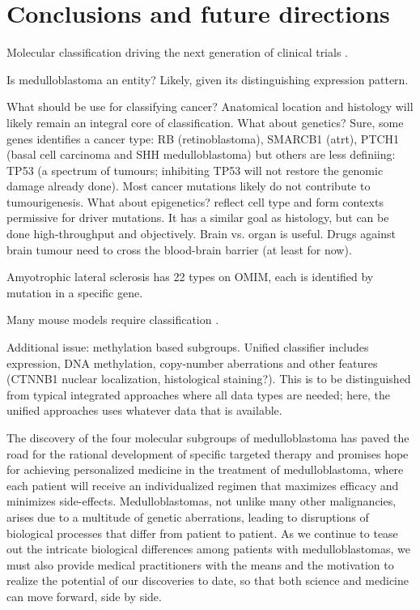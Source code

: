 \chapter{Conclusions and future directions}
\label{ch:conclusion}

Molecular classification driving the next generation of clinical trials .

Is medulloblastoma an entity?
Likely, given its distinguishing expression pattern.

What should be use for classifying cancer?
Anatomical location and histology will likely remain an integral core of classification.
What about genetics? Sure, some genes identifies a cancer type: RB (retinoblastoma), SMARCB1 (\gls{atrt}), PTCH1 (basal cell carcinoma and SHH medulloblastoma) but others are less definiing: TP53 (a spectrum of tumours; inhibiting TP53 will not restore the genomic damage already done). Most cancer mutations likely do not contribute to tumourigenesis.
What about epigenetics? reflect cell type and form contexts permissive for driver mutations. It has a similar goal as histology, but can be done high-throughput and objectively.
Brain vs. organ is useful. Drugs against brain tumour need to cross the blood-brain barrier (at least for now).

Amyotrophic lateral sclerosis has 22 types on OMIM, each is identified by mutation in a specific gene.

Many mouse models require classification .

Additional issue: methylation based subgroups. Unified classifier includes expression, DNA methylation, copy-number aberrations and other features (CTNNB1 nuclear localization, histological staining?). This is to be distinguished from typical integrated approaches where all data types are needed; here, the unified approaches uses whatever data that is available.

The discovery of the four molecular subgroups of medulloblastoma has paved the road for the rational development of specific targeted therapy and promises hope for achieving personalized medicine in the treatment of medulloblastoma, where each patient will receive an individualized regimen that maximizes efficacy and minimizes side-effects. Medulloblastomas, not unlike many other malignancies, arises due to a multitude of genetic aberrations, leading to disruptions of biological processes that differ from patient to patient. As we continue to tease out the intricate biological differences among patients with medulloblastomas, we must also provide medical practitioners with the means and the motivation to realize the potential of our discoveries to date, so that both science and medicine can move forward, side by side.

